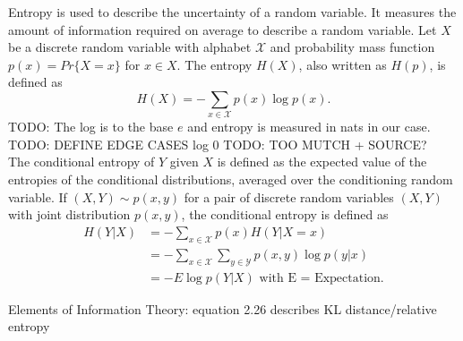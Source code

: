Entropy is used to describe the uncertainty of a random variable. It measures the amount of information required on average to describe a random variable. Let $X$ be a discrete random variable with alphabet $\mathcal{X}$ and probability mass function $p(x)=Pr\{X=x\}$ for $x\in X$.
The entropy $H(X)$, also written as $H(p)$, is defined as
\begin{equation}
    H(X) = -\sum_{x \in \mathcal{X}} p(x) \log p(x).
\end{equation}
TODO: %
The log is to the base $e$ and entropy is measured in nats in our case. TODO: DEFINE EDGE CASES log 0 TODO: TOO MUTCH + SOURCE? %
\\
The conditional entropy of $Y$ given $X$ is defined as the expected value of the entropies of the conditional distributions, averaged over the conditioning random variable. If $(X,Y) \sim p(x,y)$ for a pair of discrete random variables $(X,Y)$ with joint distribution $p(x,y)$, the conditional entropy is defined as \\
\begin{align}
    H(Y|X)&= -\sum_{x \in \mathcal{X}} p(x) H(Y|X=x) \\
    &= - \sum_{x \in \mathcal{X}} \sum_{y \in \mathcal{Y}}p(x,y) \log p(y|x) \\
    &= -E \log p(Y|X) \text{ with E = Expectation}.
\end{align}

Elements of Information Theory: equation 2.26 describes KL distance/relative entropy \bigskip

